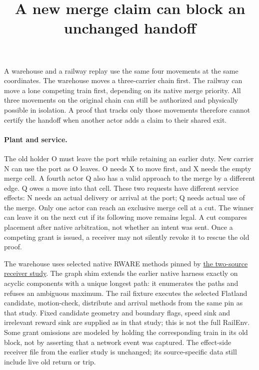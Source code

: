 \documentclass[11pt]{article}
\title{A new merge claim can block an unchanged handoff}
\author{}
\date{}
\begin{document}
\maketitle

A warehouse and a railway replay use the same four movements at the same coordinates. The warehouse moves a three-carrier chain first. The railway can move a lone competing train first, depending on its native merge priority. All three movements on the original chain can still be authorized and physically possible in isolation. A proof that tracks only those movements therefore cannot certify the handoff when another actor adds a claim to their shared exit.

\paragraph{Plant and service.}
The old holder O must leave the port while retaining an earlier duty. New carrier N can use the port as O leaves. O needs X to move first, and X needs the empty merge cell. A fourth actor Q also has a valid approach to the merge by a different edge. Q owes a move into that cell. These two requests have different service effects: N needs an actual delivery or arrival at the port; Q needs actual use of the merge. Only one actor can reach an exclusive merge cell at a cut. The winner can leave it on the next cut if its following move remains legal. A cut compares placement after native arbitration, not whether an intent was sent. Once a competing grant is issued, a receiver may not silently revoke it to rescue the old proof.

The warehouse uses selected native RWARE methods pinned by \href{https://github.com/eternal-november/eos-research-programmes/pull/429}{the two-source receiver study}. The graph shim extends the earlier native harness exactly on acyclic components with a unique longest path: it enumerates the paths and refuses an ambiguous maximum. The rail fixture executes the selected Flatland candidate, motion-check, distribute and arrival methods from the same pin as that study. Fixed candidate geometry and boundary flags, speed sink and irrelevant reward sink are supplied as in that study; this is not the full RailEnv. Some grant omissions are modeled by holding the corresponding train in its old block, not by asserting that a network event was captured. The effect-side receiver file from the earlier study is unchanged; its source-specific data still include live old return or trip.
\end{document}
